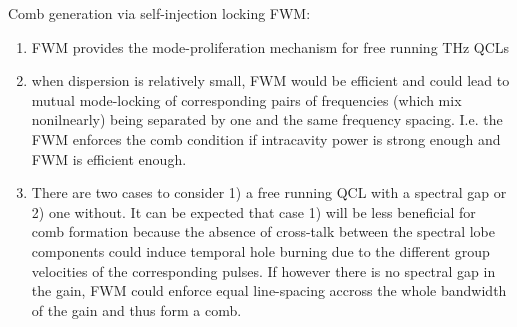 \documentclass[10pt,letterpaper]{article}
\begin{document}
	
	Comb generation via self-injection locking FWM: 
	\begin{enumerate}
		\item FWM provides the mode-proliferation mechanism for free running THz QCLs
		\item when dispersion is relatively small, FWM would be efficient and could lead to mutual mode-locking of corresponding pairs of frequencies (which mix nonilnearly) being separated by one and the same frequency spacing. I.e. the FWM enforces the comb condition if intracavity power is strong enough and FWM is efficient enough. 
		\item There are two cases to consider 1) a free running QCL with a spectral gap or 2) one without. It can be expected that case 1) will be less beneficial for comb formation because the absence of cross-talk between the spectral lobe components could induce temporal hole burning due to the different group velocities of the corresponding pulses. If however there is no spectral gap in the gain, FWM could enforce equal line-spacing accross the whole bandwidth of the gain and thus form a comb. 
	\end{enumerate}
		
		  
	
	
\end{document}
